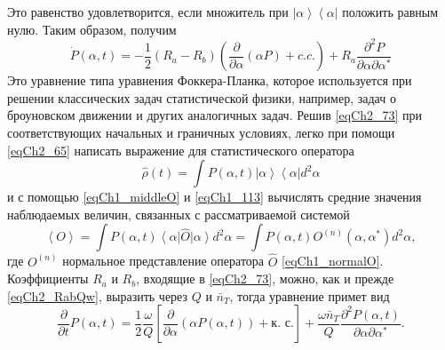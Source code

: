 Это равенство удовлетворится, если множитель при  
$\left|\alpha\right>\left<\alpha\right|$  положить равным 
нулю. Таким образом, получим 
\begin{equation}
\dot{P}\left(\alpha, t\right) = 
-\frac{1}{2}\left(R_a - R_b\right)
\left(
\frac{\partial}{\partial \alpha}\left(\alpha P\right) + c.c.
\right)
+ R_a
\frac{\partial^2 P}{\partial \alpha \partial \alpha^{*}}
\label{eqCh2_73}
\end{equation}
Это уравнение типа уравнения Фоккера-Планка, которое используется при
решении классических задач статистической физики, например, задач о
броуновском движении и других аналогичных задач. Решив
\eqref{eqCh2_73} при соответствующих начальных и граничных условиях,
легко при помощи \eqref{eqCh2_65} написать выражение для
статистического оператора 
\[
\hat{\rho}\left(t\right) = 
\int P\left(\alpha, t\right)
\left|\alpha\right>\left<\alpha\right| 
d^2 \alpha
\]
и с помощью \eqref{eqCh1_middleO} и \eqref{eqCh1_113} вычислять
средние значения наблюдаемых величин, связанных с рассматриваемой
системой   
\[
\left<O\right>= \int P\left(\alpha, t\right) \left<\alpha\right|\hat{O}\left|\alpha\right>d^2
\alpha =
\int  P\left(\alpha, t\right)O^{\left(n\right)}\left(\alpha, \alpha^{*}\right)d^2\alpha,
\]
где $O^{\left(n\right)}$ нормальное представление оператора $\hat{O}$ \eqref{eqCh1_normalO}.
Коэффициенты  $R_a$ и  $R_b$,  входящие в \eqref{eqCh2_73}, можно, как
и прежде \eqref{eqCh2_RabQw}, выразить через  $Q$  и $\bar{n}_T$,
тогда уравнение примет вид 
\begin{equation}
\frac{\partial}{\partial t}P\left(\alpha, t\right) = 
\frac{1}{2}\frac{\omega}{Q}\left[
\frac{\partial}{\partial \alpha}\left(
\alpha P\left(\alpha, t\right)
\right) + \mbox{к. с.}
\right]
+
\frac{\omega \bar{n}_T}{Q} \frac{\partial^2  P\left(\alpha,
  t\right)}{\partial \alpha \partial \alpha^{*}}.
\label{eqCh2_74}
\end{equation}


